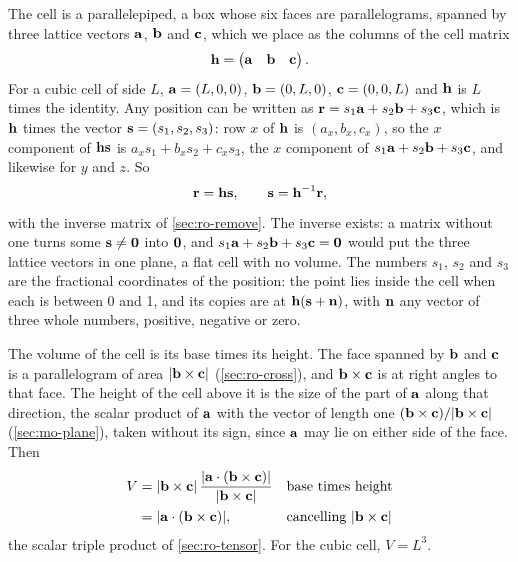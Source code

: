The cell is a parallelepiped, a box whose six faces are parallelograms,
spanned by three lattice vectors $\bm{\mathrm{a}}$,
$\bm{\mathrm{b}}$ and $\bm{\mathrm{c}}$, which we place as the columns of the cell matrix
\begin{equation}
   \bm{\mathrm{h}} = \begin{pmatrix} \bm{\mathrm{a}} & \bm{\mathrm{b}} & \bm{\mathrm{c}} \end{pmatrix} .
   \label{eq:md-cell}
\end{equation}
For a cubic cell of side $L$, $\bm{\mathrm{a}} = (L, 0, 0)$, $\bm{\mathrm{b}} = (0, L, 0)$,
$\bm{\mathrm{c}} = (0, 0, L)$ and $\bm{\mathrm{h}}$ is $L$ times the identity. Any position
can be written as $\bm{\mathrm{r}} = s_1\bm{\mathrm{a}} + s_2\bm{\mathrm{b}} + s_3\bm{\mathrm{c}}$, which is
$\bm{\mathrm{h}}$ times the vector $\bm{\mathrm{s}} = (s_1, s_2, s_3)$: row $x$ of $\bm{\mathrm{h}}$
is $(a_x, b_x, c_x)$, so the $x$ component of $\bm{\mathrm{h}}\bm{\mathrm{s}}$ is $a_xs_1 +
b_xs_2 + c_xs_3$, the $x$ component of $s_1\bm{\mathrm{a}} + s_2\bm{\mathrm{b}} +
s_3\bm{\mathrm{c}}$, and likewise for $y$ and $z$. So
\begin{equation}
   \bm{\mathrm{r}} = \bm{\mathrm{h}}\bm{\mathrm{s}} , \qquad \bm{\mathrm{s}} = \bm{\mathrm{h}}^{-1}\bm{\mathrm{r}} ,
   \label{eq:md-fractional}
\end{equation}
with the inverse matrix of \cref{sec:ro-remove}. The inverse exists: a
matrix without one turns some $\bm{\mathrm{s}} \neq \bm{\mathrm{0}}$ into $\bm{\mathrm{0}}$, and
$s_1\bm{\mathrm{a}} + s_2\bm{\mathrm{b}} + s_3\bm{\mathrm{c}} = \bm{\mathrm{0}}$ would put the three lattice
vectors in one plane, a flat cell with no volume. The numbers $s_1$, $s_2$
and $s_3$ are the fractional coordinates of the position: the point lies
inside the cell when each is between 0 and 1, and its copies are at
$\bm{\mathrm{h}}(\bm{\mathrm{s}} + \bm{\mathrm{n}})$, with $\bm{\mathrm{n}}$ any vector of three whole
numbers, positive, negative or zero.

The volume of the cell is its base times its height. The face spanned by
$\bm{\mathrm{b}}$ and $\bm{\mathrm{c}}$ is a parallelogram of area $\lvert\bm{\mathrm{b}}\times\bm{\mathrm{c}}
\rvert$ (\cref{sec:ro-cross}), and $\bm{\mathrm{b}}\times\bm{\mathrm{c}}$ is at right
angles to that face. The height of the cell above it is the size of the
part of $\bm{\mathrm{a}}$ along that direction, the scalar product of $\bm{\mathrm{a}}$
with the vector of length one $(\bm{\mathrm{b}}\times\bm{\mathrm{c}})/\lvert\bm{\mathrm{b}}\times
\bm{\mathrm{c}}\rvert$ (\cref{sec:mo-plane}), taken without its sign, since
$\bm{\mathrm{a}}$ may lie on either side of the face. Then
\begin{align}
   V &= \lvert\bm{\mathrm{b}}\times\bm{\mathrm{c}}\rvert\,
        \frac{\lvert\bm{\mathrm{a}}\cdot(\bm{\mathrm{b}}\times\bm{\mathrm{c}})\rvert}
             {\lvert\bm{\mathrm{b}}\times\bm{\mathrm{c}}\rvert}
     && \text{base times height}\notag\\
     &= \lvert\bm{\mathrm{a}}\cdot(\bm{\mathrm{b}}\times\bm{\mathrm{c}})\rvert ,
     && \text{cancelling $\lvert\bm{\mathrm{b}}\times\bm{\mathrm{c}}\rvert$}
   \label{eq:md-volume}
\end{align}
the scalar triple product of \cref{sec:ro-tensor}. For the cubic cell, $V =
L^3$.


